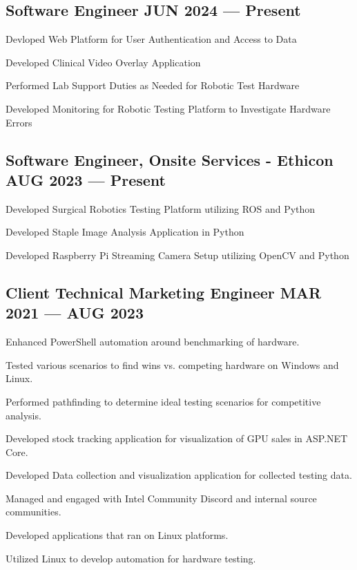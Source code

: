 \subsection{{Software Engineer \hfill JUN 2024 --- Present}}
\begin{zitemize}
\item Devloped Web Platform for User Authentication and Access to Data
\item Developed Clinical Video Overlay Application
\item Performed Lab Support Duties as Needed for Robotic Test Hardware
\item Developed Monitoring for Robotic Testing Platform to Investigate Hardware Errors
\end{zitemize}

\subsection{{Software Engineer, Onsite Services - Ethicon \hfill AUG 2023 --- Present}}
\begin{zitemize}
\item Developed Surgical Robotics Testing Platform utilizing ROS and Python
\item Developed Staple Image Analysis Application in Python
\item Developed Raspberry Pi Streaming Camera Setup utilizing OpenCV and Python
\end{zitemize}

\subsection{{Client Technical Marketing Engineer \hfill MAR 2021 --- AUG 2023}}
\begin{zitemize}
\item Enhanced PowerShell automation around benchmarking of hardware.
\item Tested various scenarios to find wins vs. competing hardware on Windows and Linux.
\item Performed pathfinding to determine ideal testing scenarios for competitive analysis.
\item Developed stock tracking application for visualization of GPU sales in ASP.NET Core.
\item Developed Data collection and visualization application for collected testing data.
\item Managed and engaged with Intel Community Discord and internal source communities.
\item Developed applications that ran on Linux platforms.
\item Utilized Linux to develop automation for hardware testing.
\end{zitemize}


